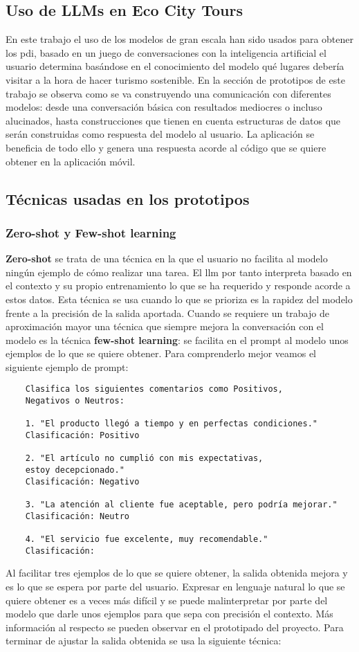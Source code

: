 \subsection{Uso de LLMs en Eco City Tours}

En este trabajo el uso de los modelos de gran escala han sido usados para obtener los \acrfull{pdi}, basado en un juego de conversaciones con la inteligencia artificial el usuario determina basándose en el conocimiento del modelo qué lugares debería visitar a la hora de hacer turismo sostenible.
En la sección de prototipos de este trabajo se observa como se va construyendo una comunicación con diferentes modelos: desde una conversación básica con resultados mediocres o incluso alucinados, hasta construcciones que tienen en cuenta estructuras de datos que serán construidas como respuesta del modelo al usuario. La aplicación se beneficia de todo ello y genera una respuesta acorde al código que se quiere obtener en la aplicación móvil.
\subsection{Técnicas usadas en los prototipos}
\subsubsection{Zero-shot y Few-shot learning}
\textbf{Zero-shot} se trata de una técnica en la que el usuario no facilita al modelo ningún ejemplo de cómo realizar una tarea. El \acrshort{llm} por tanto interpreta basado en el contexto y su propio entrenamiento lo que se ha requerido y responde acorde a estos datos. Esta técnica se usa cuando lo que se prioriza es la rapidez del modelo frente a la precisión de la salida aportada. Cuando se requiere un trabajo de aproximación mayor una técnica que siempre mejora la conversación con el modelo es la técnica \textbf{few-shot learning}: se facilita en el prompt al modelo unos ejemplos de lo que se quiere obtener. Para comprenderlo mejor veamos el siguiente ejemplo de prompt: 
\begin{verbatim}
	Clasifica los siguientes comentarios como Positivos, 
	Negativos o Neutros:
	
	1. "El producto llegó a tiempo y en perfectas condiciones."
	Clasificación: Positivo
	
	2. "El artículo no cumplió con mis expectativas, 
	estoy decepcionado."
	Clasificación: Negativo
	
	3. "La atención al cliente fue aceptable, pero podría mejorar."
	Clasificación: Neutro
	
	4. "El servicio fue excelente, muy recomendable."
	Clasificación:
\end{verbatim}
Al facilitar tres ejemplos de lo que se quiere obtener, la salida obtenida mejora y es lo que se espera por parte del usuario. Expresar en lenguaje natural lo que se quiere obtener es a veces más difícil y se puede malinterpretar por parte del modelo que darle unos ejemplos para que sepa con precisión el contexto. Más información al respecto se pueden observar en el prototipado del proyecto. Para terminar de ajustar la salida obtenida se usa la siguiente técnica:

